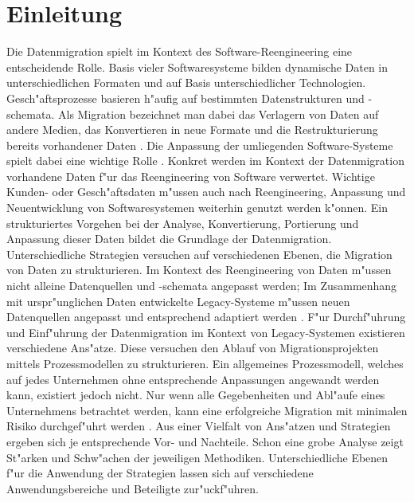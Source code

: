 \section{Einleitung}
\label{chapter:einleitung}


Die Datenmigration spielt im Kontext des Software-Reengineering eine entscheidende Rolle. Basis vieler Softwaresysteme bilden dynamische Daten in unterschiedlichen Formaten und auf Basis unterschiedlicher Technologien. Gesch"aftsprozesse basieren h"aufig auf bestimmten Datenstrukturen und -schemata. Als Migration bezeichnet man dabei das Verlagern von Daten auf andere Medien, das Konvertieren in neue Formate und die Restrukturierung bereits vorhandener Daten \citep{morris-2012}. Die Anpassung der umliegenden Software-Systeme spielt dabei eine wichtige Rolle \citep{henrard-2002}.
\lb
Konkret werden im Kontext der Datenmigration vorhandene Daten f"ur das Reengineering von Software verwertet. Wichtige Kunden- oder Gesch"aftsdaten m"ussen auch nach Reengineering, Anpassung und Neuentwicklung von Softwaresystemen weiterhin genutzt werden k"onnen. Ein strukturiertes Vorgehen bei der Analyse, Konvertierung, Portierung und Anpassung dieser Daten bildet die Grundlage der Datenmigration.  
\lb
Unterschiedliche Strategien versuchen auf verschiedenen Ebenen, die Migration von Daten zu strukturieren. Im Kontext des Reengineering von Daten m"ussen nicht alleine Datenquellen und -schemata angepasst werden; Im Zusammenhang mit urspr"unglichen Daten entwickelte Legacy-Systeme m"ussen neuen Datenquellen angepasst und entsprechend adaptiert werden \citep{henrard-2002}.	
\lb
F"ur Durchf"uhrung und Einf"uhrung der Datenmigration im Kontext von Legacy-Systemen existieren verschiedene Ans"atze. Diese versuchen den Ablauf von Migrationsprojekten mittels Prozessmodellen zu strukturieren. Ein allgemeines Prozessmodell, welches auf jedes Unternehmen ohne entsprechende Anpassungen angewandt werden kann, existiert jedoch nicht. Nur wenn alle Gegebenheiten und Abl"aufe eines Unternehmens betrachtet werden, kann eine erfolgreiche Migration mit minimalen Risiko durchgef"uhrt werden \citep{wuLawless-1997} \citep{ackermann-2005}.
\lb
Aus einer Vielfalt von Ans"atzen und Strategien ergeben sich je entsprechende Vor- und Nachteile. Schon eine grobe Analyse zeigt St"arken und Schw"achen der jeweiligen Methodiken. Unterschiedliche Ebenen f"ur die Anwendung der Strategien lassen sich auf verschiedene Anwendungsbereiche und Beteiligte zur"uckf"uhren.
